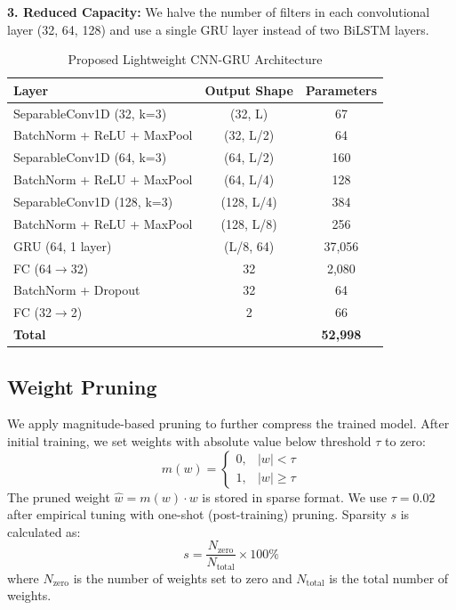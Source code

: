 \documentclass[a4paper,fleqn]{cas-sc}
\begin{document}
\noindent\textbf{3. Reduced Capacity:} We halve the number of filters in each convolutional layer (32, 64, 128) and use a single GRU layer instead of two BiLSTM layers.

\begin{table}[t]
\centering
\caption{Proposed Lightweight CNN-GRU Architecture}
\label{tab:lightweight}
\begin{tabular}{lcc}
\toprule
Layer & Output Shape & Parameters \\
\midrule
SeparableConv1D (32, k=3) & (32, L) & 67 \\
BatchNorm + ReLU + MaxPool & (32, L/2) & 64 \\
SeparableConv1D (64, k=3) & (64, L/2) & 160 \\
BatchNorm + ReLU + MaxPool & (64, L/4) & 128 \\
SeparableConv1D (128, k=3) & (128, L/4) & 384 \\
BatchNorm + ReLU + MaxPool & (128, L/8) & 256 \\
GRU (64, 1 layer) & (L/8, 64) & 37,056 \\
FC (64$\rightarrow$32) & 32 & 2,080 \\
BatchNorm + Dropout & 32 & 64 \\
FC (32$\rightarrow$2) & 2 & 66 \\
\midrule
\textbf{Total} & & \textbf{52,998} \\
\bottomrule
\end{tabular}
\end{table}

\subsection{Weight Pruning}
\label{sec:pruning}

We apply magnitude-based pruning to further compress the trained model. After initial training, we set weights with absolute value below threshold $\tau$ to zero:
\begin{equation}
m(w) = \begin{cases} 0, & |w| < \tau \\ 1, & |w| \geq \tau \end{cases}
\end{equation}
The pruned weight $\hat{w} = m(w) \cdot w$ is stored in sparse format. We use $\tau = 0.02$ after empirical tuning with one-shot (post-training) pruning. Sparsity $s$ is calculated as:
\begin{equation}
s = \frac{N_{\text{zero}}}{N_{\text{total}}} \times 100\%
\label{eq:sparsity}
\end{equation}
where $N_{\text{zero}}$ is the number of weights set to zero and $N_{\text{total}}$ is the total number of weights.
\end{document}
